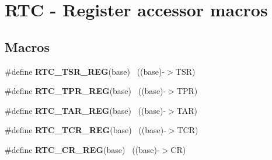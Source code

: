 \hypertarget{group___r_t_c___register___accessor___macros}{}\section{R\+T\+C -\/ Register accessor macros}
\label{group___r_t_c___register___accessor___macros}
\subsection*{Macros}
\begin{DoxyCompactItemize}
\item 
\hypertarget{group___r_t_c___register___accessor___macros_ga09970f896ffee07c3a05b92951184ffa}{}\#define {\bfseries R\+T\+C\+\_\+\+T\+S\+R\+\_\+\+R\+E\+G}(base)                                            ~((base)-\/$>$T\+S\+R)\label{group___r_t_c___register___accessor___macros_ga09970f896ffee07c3a05b92951184ffa}

\item 
\hypertarget{group___r_t_c___register___accessor___macros_ga27c10c8200591617cc2855238c16c3f1}{}\#define {\bfseries R\+T\+C\+\_\+\+T\+P\+R\+\_\+\+R\+E\+G}(base)                                            ~((base)-\/$>$T\+P\+R)\label{group___r_t_c___register___accessor___macros_ga27c10c8200591617cc2855238c16c3f1}

\item 
\hypertarget{group___r_t_c___register___accessor___macros_gacf7df0fe4d98dc87b21ee82db3c7e858}{}\#define {\bfseries R\+T\+C\+\_\+\+T\+A\+R\+\_\+\+R\+E\+G}(base)                                            ~((base)-\/$>$T\+A\+R)\label{group___r_t_c___register___accessor___macros_gacf7df0fe4d98dc87b21ee82db3c7e858}

\item 
\hypertarget{group___r_t_c___register___accessor___macros_ga0ffe9bb5a8168f247f3aac5de0d59080}{}\#define {\bfseries R\+T\+C\+\_\+\+T\+C\+R\+\_\+\+R\+E\+G}(base)                                            ~((base)-\/$>$T\+C\+R)\label{group___r_t_c___register___accessor___macros_ga0ffe9bb5a8168f247f3aac5de0d59080}

\item 
\hypertarget{group___r_t_c___register___accessor___macros_ga478ae857b195216a8eff27d2fdb74ffd}{}\#define {\bfseries R\+T\+C\+\_\+\+C\+R\+\_\+\+R\+E\+G}(base)                                              ~((base)-\/$>$C\+R)\label{group___r_t_c___register___accessor___macros_ga478ae857b195216a8eff27d2fdb74ffd}


\end{DoxyCompactItemize}
